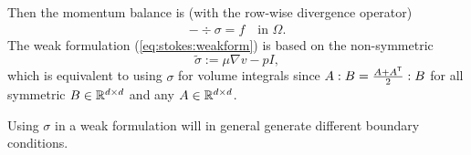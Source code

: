 Then the momentum balance is (with the row-wise divergence operator)
%
\begin{align*}
-\div \sigma = f \quad \mbox{in $\Omega$}.
\end{align*}
%
The weak formulation (\ref{eq:stokes:weakform}) is based on the non-symmetric
%
\begin{equation}\label{eq:Stokes:CauchyStressnonsymmetric}
\widetilde{\sigma} := \mu \nabla v - p I,
\end{equation}
%
which is equivalent to using $\sigma$ for volume integrals since $A:B=\frac{A+{A}^{\mathsf{T}}}{2}:B$ for all symmetric $B\in\mathbb R^{d\times d}$ and any $A\in\mathbb R^{d\times d}$.

Using $\sigma$ in a weak formulation will in general generate different boundary conditions.
%
